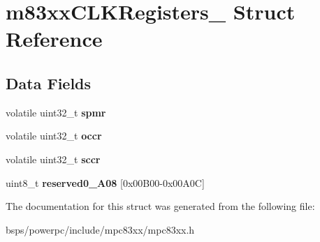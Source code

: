 \hypertarget{structm83xxCLKRegisters__}{}\section{m83xx\+C\+L\+K\+Registers\+\_\+ Struct Reference}
\label{structm83xxCLKRegisters__}
\subsection*{Data Fields}
\begin{DoxyCompactItemize}
\item 
\mbox{\label{structm83xxCLKRegisters___a5c68d757340ee6e63e3f25dcf1e9db15}} 
volatile uint32\+\_\+t {\bfseries spmr}
\item 
\mbox{\label{structm83xxCLKRegisters___a731af77aa3fd5dd2de417caf023465dc}} 
volatile uint32\+\_\+t {\bfseries occr}
\item 
\mbox{\label{structm83xxCLKRegisters___a0e6c7430f4b856322fec427c9514aafe}} 
volatile uint32\+\_\+t {\bfseries sccr}
\item 
\mbox{\label{structm83xxCLKRegisters___a829beb5438ecfcbebecdb6d4e3148132}} 
uint8\+\_\+t {\bfseries reserved0\+\_\+A08} \mbox{[}0x00\+B00-\/0x00\+A0\+C\mbox{]}
\end{DoxyCompactItemize}


The documentation for this struct was generated from the following file\+:\begin{DoxyCompactItemize}
\item 
bsps/powerpc/include/mpc83xx/mpc83xx.\+h\end{DoxyCompactItemize}
